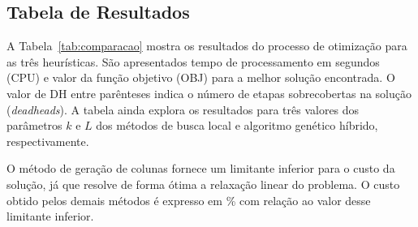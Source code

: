 \subsection{Tabela de Resultados}
\label{sec:valores}

A Tabela~\ref{tab:comparacao} mostra os resultados do processo de otimização para as três
heurísticas. São apresentados tempo de processamento em segundos (CPU) e valor da função objetivo
(OBJ) para a melhor solução encontrada. O valor de DH entre parênteses indica o número de etapas
sobrecobertas na solução ({\it deadheads}). A tabela ainda explora os resultados para três valores
dos parâmetros $k$ e $L$ dos métodos de busca local e algoritmo genético híbrido, respectivamente.

O método de geração de colunas fornece um limitante inferior para o custo da solução, já que resolve
de forma ótima a relaxação linear do problema. O custo obtido pelos demais métodos é expresso em
\% com relação ao valor desse limitante inferior.

